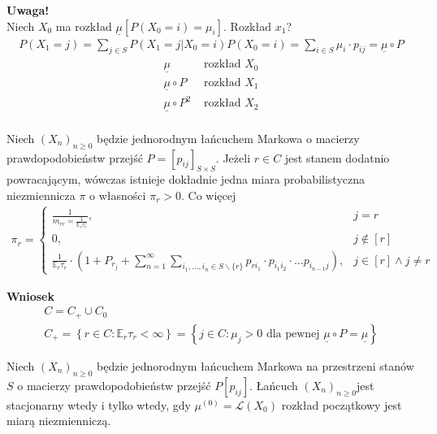 \textbf{Uwaga!}\\
Niech $ X_0 $ ma rozkład $ \underline{\mu}\left[P\left(X_0=i\right)=\mu_i\right] $. Rozkład $ x_1 $?
\begin{gather*}
P\left(X_1=j\right)=
\sum_{j\in S}P\left(X_1=j|X_0=i\right)P\left(X_0=i\right)=
\sum_{i\in S}\mu_i\cdot p_{ij}=\underline{\mu}\circ P
\end{gather*}
\begin{align*}
\underline{\mu}&\text{ rozkład }X_0\\
\underline{\mu}\circ P&\text{ rozkład }X_1\\
\underline{\mu}\circ P^2&\text{ rozkład }X_2\\
\end{align*}
\begin{twr}
Niech $ \left(X_n\right)_{n\ge 0} $ będzie jednorodnym łańcuchem Markowa o macierzy prawdopodobieństw przejść $ P=\left[p_{ij}\right] _{S\times S}$. Jeżeli $ r\in C $ jest stanem dodatnio powracającym, wówczas istnieje dokładnie jedna miara probabilistyczna niezmiennicza $ \pi$ o własności $ \pi_r>0 $. Co więcej
\begin{gather*}
\pi_r=
\left \{
\begin{array}{ll}
\frac{1}{m_{rr}=\frac{1}{\mathbb E _r\tau_r}},&j=r\\
0,&j\notin [r]\\
\frac{1}{\mathbb E _r\tau_r}\cdot \left(1+P_{r_j}+\sum_{n=1}^{\infty }\sum_{i_1,\dots,i_n\in S\backslash\{r\}}
p_{ri_1}\cdot p_{i_1i_2}\cdot\dots p_{i_{n-1}j}\right),&j\in [r]\wedge j\neq r
\end{array}
\right .
\end{gather*}
\end{twr}
\textbf{Wniosek}
\begin{gather*}
C=C_+\cup C_0\\
C_+=\left\{r\in C:\mathbb E _r\tau_r<\infty \right\}=\left\{j\in C:\mu_j>0\text{ dla pewnej }\underline{\mu}\circ P=\underline{\mu}\right\}
\end{gather*}
\begin{twr}
Niech $ \left(X_n\right)_{n\ge 0} $ będzie jednorodnym łańcuchem Markowa na przestrzeni stanów $ S $ o macierzy prawdopodobieństw przejść $ P[p_{ij}] $. Łańcuch $ \left(X_n\right)_{n\ge 0} $jest stacjonarny wtedy i tylko wtedy, gdy $ \mu^{(0)}=\mathcal L\left(X_0\right) $ rozkład początkowy jest miarą niezmienniczą.
\end{twr}
